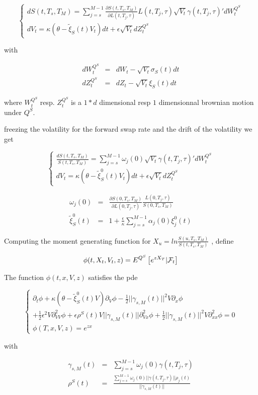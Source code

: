 \documentclass[10pt,a4paper,english,landscape]{slides}
\newcommand{\ban}{\begin{eqnarray*}}
\newcommand{\ean}{\end{eqnarray*}}
\begin{document}
\[
\left\lbrace 
\begin{array}{l}
dS(t,T_s,T_M)=\sum_{j=s}^{M-1}\frac{\partial S(t,T_s,T_M) }{\partial L(t,T_j,\tau)}L(t,T_j,\tau)\sqrt{V_t}\gamma(t,T_j,\tau)'dW^{Q^S}_t\\
dV_t=\kappa(\theta - \tilde \xi_S(t)V_t)dt+\epsilon \sqrt{V_t}dZ^{Q^S}_t
\end{array}
\right.
\]

with

\ban
dW^{Q^S}_t&=&dW_t-\sqrt{V_t}\sigma_S(t)dt\\
dZ^{Q^S}_t&=&dZ_t-\sqrt{V_t}\xi_S(t)dt
\ean

where $W^{Q^S}_t$ resp. $Z^{Q^S}_t$ is a $1*d$ dimensional resp $1$ dimensionnal brownian motion under $Q^S$.

 
freezing the volatility for the forward swap rate and the drift of the volatility we get


\[
\left\lbrace 
\begin{array}{l}
\frac{dS(t,T_s,T_M)}{S(t,T_s,T_M)}= \sum_{j=s}^{M-1}\omega_j(0)\sqrt{V_t}\gamma(t,T_j,\tau)'dW^{Q^S}_t\\
dV_t=\kappa(\theta - \tilde \xi_S^0(t)V_t)dt+\epsilon \sqrt{V_t}dZ^{Q^S}_t
\end{array}
\right.
\]

\ban
\omega_j(0)&=&\frac{\partial S(0,T_s,T_M) }{\partial L(0,T_j,\tau)}\frac{L(0,T_j,\tau)}{S(0,T_s,T_M)}\\
\tilde \xi_S^0(t)&=&1+\frac{\epsilon}{\kappa}\sum_{j=s}^{M-1}\alpha_j(0)\xi_j^0(t)
\ean

Computing the moment generating function for $X_u=ln\frac{S(u,T_s,T_M)}{S(t,T_s,T_M)}$ , define 

\ban
\phi(t,X_t,V_t,z)=E^{Q^S}\left[ e^{zX_T}|{\cal F}_t\right]
\ean

The function $\phi(t,x,V,z)$ satisfies the pde

\[
\left\lbrace 
\begin{array}{l}
\partial_t\phi+\kappa(\theta - \tilde \xi_S^0(t)V)\partial_V\phi -\frac{1}{2}||\gamma_{s,M}(t)||^2V\partial_x\phi \\
+\frac{1}{2}\epsilon^2V\partial^2_{VV}\phi+\epsilon\rho^S(t)V||\gamma_{s,M}(t)||\partial^2_{Vx}\phi+\frac{1}{2}||\gamma_{s,M}(t)||^2V\partial^2_{xx}\phi=0\\
\phi(T,x,V,z)=e^{zx}
\end{array}
\right.
\]

with

\ban
\gamma_{s,M}(t)&=&\sum_{j=s}^{M-1}\omega_j(0)\gamma(t,T_j,\tau)\\
\rho^S(t)&=&\frac{\sum_{j=s}^{M-1} \omega_j(0)||\gamma(t,T_j,\tau)||\rho_j(t) }{||\gamma_{s,M}(t)||}
\ean
\end{document}
